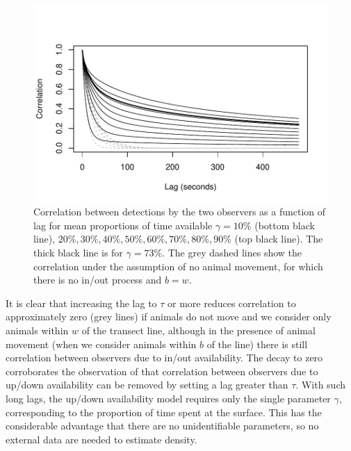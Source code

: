 \documentclass[useAMS, usenatbib, referee]{biom}\usepackage[]{graphicx}\usepackage[]{color}
\makeatletter
\def\maxwidth{ %
  \ifdim\Gin@nat@width>\linewidth
    \linewidth
  \else
    \Gin@nat@width
  \fi
}
\newenvironment{knitrout}{}{} %
\makeatother
\begin{document}
\begin{knitrout}
\color{fgcolor}\begin{figure}

{\centering \includegraphics[width=\maxwidth]{figs/fig_correlation_plot-1} 

}

\caption[Correlation between detections by the two observers as a function of lag for mean proportions of time available \(\gamma=10\%\) (bottom black line), \(20\%, 30\%, 40\%, 50\%, 60\%, 70\%, 80\%, 90\%\) (top black line)]{Correlation between detections by the two observers as a function of lag for mean proportions of time available \(\gamma=10\%\) (bottom black line), \(20\%, 30\%, 40\%, 50\%, 60\%, 70\%, 80\%, 90\%\) (top black line). The thick black line is for \(\gamma=73\%\). The grey dashed lines show the correlation under the assumption of no animal movement, for which there is no in/out process and $b=w$.}\label{fig:fig_correlation_plot}
\end{figure}


\end{knitrout}

It is clear that increasing the lag to $\tau$ or more reduces correlation to approximately zero (grey lines) if animals do not move and we consider only animals within $w$ of the transect line, although in the presence of animal movement (when we consider animals within $b$ of the line) there is still correlation between observers due to in/out availability. The decay to zero corroborates the observation of \cite{Stevenson+al:19} that correlation between observers due to up/down availability can be removed by setting a lag greater than $\tau$. With such long lags, the up/down availability model requires only the single parameter $\gamma$, corresponding to the proportion of time spent at the surface. This has the considerable advantage that there are no unidentifiable parameters, so no external data are needed to estimate density.
\end{document}
